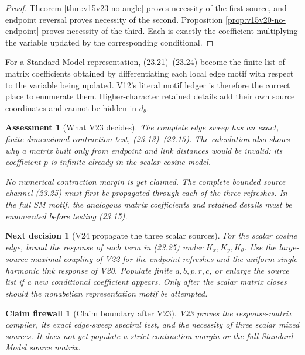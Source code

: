 \documentclass[11pt]{article}
\newtheorem{firewall}[theorem]{Claim firewall}
\newtheorem{decision}[theorem]{Next decision}
\newtheorem{assessment}[theorem]{Assessment}
\theoremstyle{remark}
\begin{document}
\begin{proof}
Theorem \ref{thm:v15v23-no-angle} proves necessity of the first
source, and endpoint reversal proves necessity of the second.
Proposition \ref{prop:v15v20-no-endpoint} proves necessity of the
third.  Each is exactly the coefficient multiplying the variable
updated by the corresponding conditional.
\end{proof}

For a Standard Model representation, (23.21)--(23.24) become the
finite list of matrix coefficients obtained by differentiating each
local edge motif with respect to the variable being updated.  V12's
literal motif ledger is therefore the correct place to enumerate
them.  Higher-character retained details add their own source
coordinates and cannot be hidden in \(d_\theta\).

\begin{assessment}[What V23 decides]
\label{ass:v15v23-reading}
The complete edge sweep has an exact, finite-dimensional contraction
test, (23.13)--(23.15).  The calculation also shows why a matrix
built only from endpoint and link distances would be invalid: its
coefficient \(p\) is infinite already in the scalar cosine model.

No numerical contraction margin is yet claimed.  The complete
bounded source channel (23.25) must first be propagated through
each of the three refreshes.  In the full SM motif, the analogous
matrix coefficients and retained details must be enumerated before
testing (23.15).
\end{assessment}

\begin{decision}[V24 propagate the three scalar sources]
\label{dec:v15v23-next}
For the scalar cosine edge, bound the response of each term in
(23.25) under \(K_x,K_y,K_\theta\).  Use the large-source maximal
coupling of V22 for the endpoint refreshes and the uniform
single-harmonic link response of V20.  Populate finite
\(a,b,p,r,c\), or enlarge the source list if a new conditional
coefficient appears.  Only after the scalar matrix closes should
the nonabelian representation motif be attempted.
\end{decision}

\begin{firewall}[Claim boundary after V23]
\label{fire:v15v23}
V23 proves the response-matrix compiler, its exact edge-sweep
spectral test, and the necessity of three scalar mixed sources.  It
does not yet populate a strict contraction margin or the full
Standard Model source matrix.
\end{firewall}
\end{document}
